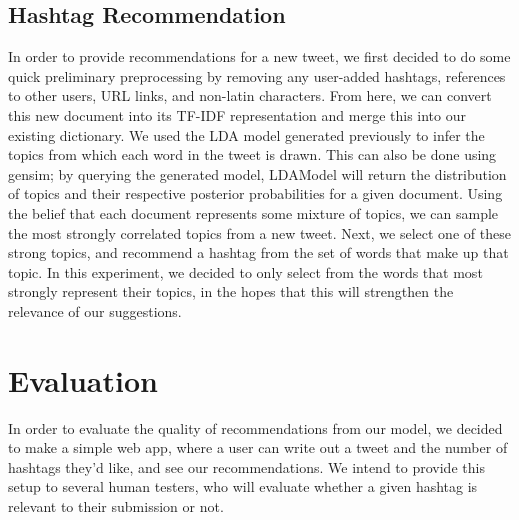 \documentclass{acm_proc_article-sp}
\begin{document}
\subsection{Hashtag Recommendation}
\hspace*{5mm}In order to provide recommendations for a new tweet, we first decided to do some quick preliminary preprocessing by removing any user-added hashtags, references to other users, URL links, and non-latin characters. From here, we can convert this new document into its TF-IDF representation and merge this into our existing dictionary. We used the LDA model generated previously to infer the topics from which each word in the tweet is drawn. This can also be done using gensim; by querying the generated model, LDAModel will return the distribution of topics and their respective posterior probabilities for a given document. Using the belief that each document represents some mixture of topics, we can sample the most strongly correlated topics from a new tweet. Next, we select one of these strong topics, and recommend a hashtag from the set of words that make up that topic. In this experiment, we decided to only select from the words that most strongly represent their topics, in the hopes that this will strengthen the relevance of our suggestions.\\

\section{Evaluation}
\hspace*{5mm}In order to evaluate the quality of recommendations from our model, we decided to make a  simple web app, where a user can write out a tweet and the number of hashtags they'd like, and see our recommendations. We intend to provide this setup to several human testers, who will evaluate whether a given hashtag is relevant to their submission or not.\\
\end{document}
